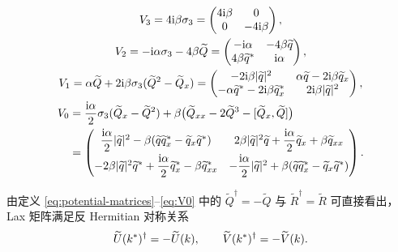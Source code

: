 \begin{gather}
V_3=4\mathrm{i}\beta\sigma_3=\begin{pmatrix}4\mathrm{i}\beta&0\\0&-4\mathrm{i}\beta\end{pmatrix},\label{eq:V32}\\
V_2=-\mathrm{i}\alpha\sigma_3-4\beta\widetilde Q=\begin{pmatrix}-\mathrm{i}\alpha&-4\beta\widetilde q\\4\beta{\widetilde q}^{*}&\mathrm{i}\alpha\end{pmatrix},\label{eq:V2}\\
V_1=\alpha\widetilde Q+2\mathrm{i}\beta\sigma_3(\widetilde Q^2-\widetilde Q_x)
=\begin{pmatrix}-2\mathrm{i}\beta|\widetilde q|^2&\alpha\widetilde q-2\mathrm{i}\beta\widetilde q_x\\-\alpha{\widetilde q}^{*}-2\mathrm{i}\beta{\widetilde q_x}^{*}&2\mathrm{i}\beta|\widetilde q|^2\end{pmatrix},\label{eq:V1}\\
\begin{aligned}
V_0&=\dfrac{\mathrm{i}\alpha}{2}\sigma_3(\widetilde Q_x-\widetilde Q^2)+\beta\bigl(\widetilde Q_{xx}-2\widetilde Q^3-[\widetilde Q_x,\widetilde Q]\bigr)\\
&=\begin{pmatrix}
\dfrac{\mathrm{i}\alpha}{2}|\widetilde q|^2-\beta(\widetilde q{\widetilde q_x}^{*}-\widetilde q_x{\widetilde q}^{*})&
2\beta|\widetilde q|^2\widetilde q+\dfrac{\mathrm{i}\alpha}{2}\widetilde q_x+\beta\widetilde q_{xx}\\[6pt]
-2\beta|\widetilde q|^2{\widetilde q}^{*}+\dfrac{\mathrm{i}\alpha}{2}{\widetilde q_x}^{*}-\beta{\widetilde q_{xx}}^{*}&
-\dfrac{\mathrm{i}\alpha}{2}|\widetilde q|^2+\beta(\widetilde q{\widetilde q_x}^{*}-\widetilde q_x{\widetilde q}^{*})
\end{pmatrix}.
\end{aligned}\label{eq:V0}
\end{gather}

由定义 \eqref{eq:potential-matrices}--\eqref{eq:V0} 中的 $\widetilde Q^\dagger=-\widetilde Q$ 与 $\widetilde R^\dagger=\widetilde R$ 可直接看出，Lax 矩阵满足反 Hermitian 对称关系
\begin{equation}\label{eq:antihermitian}
\widetilde U({k}^{*})^\dagger=-\widetilde U(k),\qquad
\widetilde V({k}^{*})^\dagger=-\widetilde V(k).
\end{equation}

